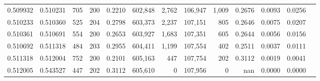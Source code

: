 \begin{tabular}{rrrrrrrrrrrrr}
0.509932 & 0.510231 &   705 & 200 &                                     0.2210 & 602,848 &   2,762 & 106,947 &   1,009 & 0.2676 & 0.0093 & 0.0256 \\
0.510233 & 0.510360 &   525 & 204 &                                     0.2798 & 603,373 &   2,237 & 107,151 &     805 & 0.2646 & 0.0075 & 0.0207 \\
0.510361 & 0.510691 &   554 & 200 &                                     0.2653 & 603,927 &   1,683 & 107,351 &     605 & 0.2644 & 0.0056 & 0.0156 \\
0.510692 & 0.511318 &   484 & 203 &                                     0.2955 & 604,411 &   1,199 & 107,554 &     402 & 0.2511 & 0.0037 & 0.0111 \\
0.511318 & 0.512004 &   752 & 200 &                                     0.2101 & 605,163 &     447 & 107,754 &     202 & 0.3112 & 0.0019 & 0.0041 \\
0.512005 & 0.543527 &   447 & 202 &                                     0.3112 & 605,610 &       0 & 107,956 &       0 &    nan & 0.0000 & 0.0000 \\
\bottomrule
\end{tabular}

